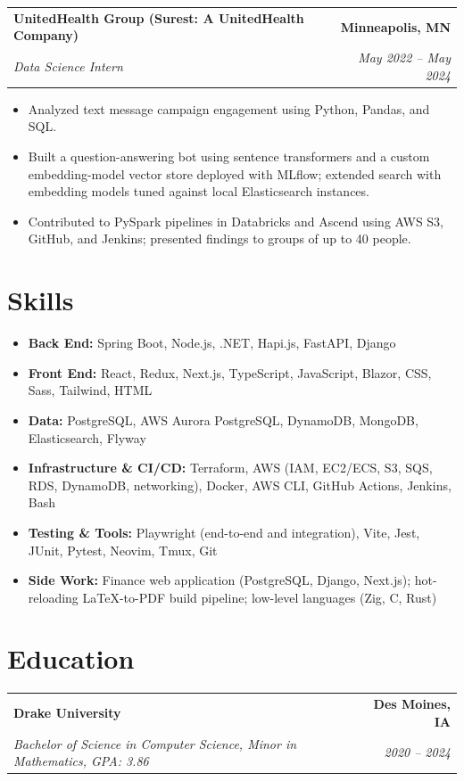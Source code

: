 \documentclass[11pt,letterpaper]{article}
\makeatletter
\newcommand{\entry}[4]{%
  \noindent\begin{tabular*}{\textwidth}{@{}l@{\extracolsep{\fill}}r@{}}
    \textbf{#1} & \textbf{#2} \\
    \textit{#3} & \textit{#4} \\
  \end{tabular*}%
  \par\vspace{2pt}%
}
\makeatother
\begin{document}
\newpage

\entry{UnitedHealth Group (Surest: A UnitedHealth Company)}{Minneapolis, MN}
      {Data Science Intern}{May 2022 -- May 2024}

\begin{itemize}
  \item Analyzed text message campaign engagement using Python, Pandas, and SQL.
  \item Built a question-answering bot using sentence transformers and a custom
    embedding-model vector store deployed with MLflow; extended search with
    embedding models tuned against local Elasticsearch instances.
  \item Contributed to PySpark pipelines in Databricks and Ascend using AWS S3,
    GitHub, and Jenkins; presented findings to groups of up to 40 people.
\end{itemize}

\section{Skills}
\begin{itemize}
  \item \textbf{Back End:} Spring Boot, Node.js, .NET, Hapi.js, FastAPI, Django
  \item \textbf{Front End:} React, Redux, Next.js, TypeScript, JavaScript,
    Blazor, CSS, Sass, Tailwind, HTML
  \item \textbf{Data:} PostgreSQL, AWS Aurora PostgreSQL, DynamoDB, MongoDB,
    Elasticsearch, Flyway
  \item \textbf{Infrastructure \& CI/CD:} Terraform, AWS (IAM, EC2/ECS, S3, SQS,
    RDS, DynamoDB, networking), Docker, AWS CLI, GitHub Actions, Jenkins, Bash
  \item \textbf{Testing \& Tools:} Playwright (end-to-end and integration),
    Vite, Jest, JUnit, Pytest, Neovim, Tmux, Git
  \item \textbf{Side Work:} Finance web application (PostgreSQL, Django,
    Next.js); hot-reloading LaTeX-to-PDF build pipeline; low-level languages
    (Zig, C, Rust)
\end{itemize}

\section{Education}
\entry{Drake University}{Des Moines, IA}
      {Bachelor of Science in Computer Science, Minor in Mathematics, GPA: 3.86}{2020 -- 2024}
\end{document}
